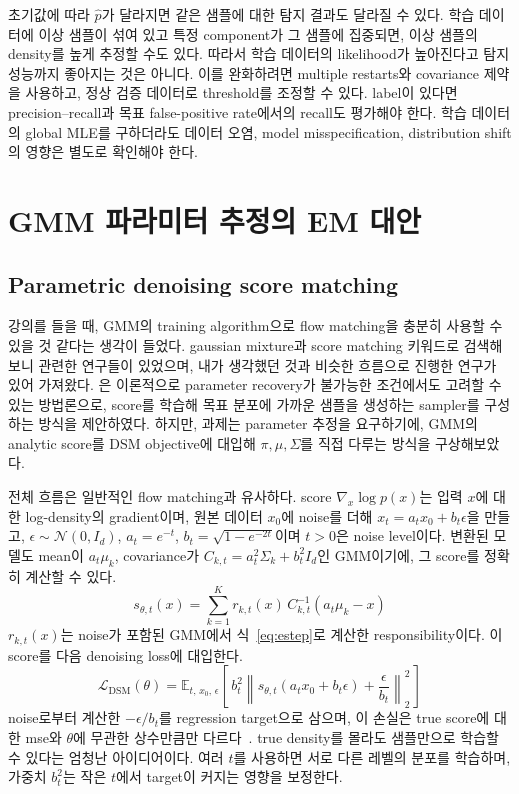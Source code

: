\documentclass[a4paper,11pt]{article}
\newcommand{\E}{\mathbb{E}}
\newcommand{\Normal}{\mathcal{N}}
\numberwithin{equation}{section}
\begin{document}
초기값에 따라 $\widehat p$가 달라지면 같은 샘플에 대한 탐지 결과도 달라질 수 있다.
학습 데이터에 이상 샘플이 섞여 있고 특정 component가 그 샘플에 집중되면,
이상 샘플의 density를 높게 추정할 수도 있다. 따라서 학습 데이터의 likelihood가 높아진다고
탐지 성능까지 좋아지는 것은 아니다.
이를 완화하려면 multiple restarts와 covariance 제약을 사용하고,
정상 검증 데이터로 threshold를 조정할 수 있다. label이 있다면 precision--recall과
목표 false-positive rate에서의 recall도 평가해야 한다.
학습 데이터의 global MLE를 구하더라도 데이터 오염, model misspecification,
distribution shift의 영향은 별도로 확인해야 한다.


\section{GMM 파라미터 추정의 EM 대안}

\subsection{Parametric denoising score matching}
\label{sec:dsm}

강의를 들을 때, GMM의 training algorithm으로 flow matching을 충분히 사용할 수 있을 것 같다는 생각이 들었다. gaussian mixture과 score matching 키워드로 검색해보니 관련한 연구들이 있었으며, 내가 생각했던 것과 비슷한 흐름으로 진행한 연구가 있어 가져왔다.
\citet{score2025}은 이론적으로 parameter recovery가 불가능한 조건에서도 고려할 수 있는 방법론으로, score를 학습해 목표 분포에 가까운 샘플을 생성하는 sampler를 구성하는 방식을 제안하였다.
하지만, 과제는 parameter 추정을 요구하기에, GMM의 analytic score를 DSM objective에 대입해 $\pi,\mu,\Sigma$를 직접 다루는 방식을 구상해보았다.

전체 흐름은 일반적인 flow matching과 유사하다. score $\nabla_x\log p(x)$는 입력 $x$에 대한 log-density의 gradient이며, 원본 데이터 $x_0$에 noise를 더해 $x_t=a_tx_0+b_t\epsilon$을 만들고, $\epsilon\sim\Normal(0,I_d)$, $a_t=e^{-t}$, $b_t=\sqrt{1-e^{-2t}}$이며 $t>0$은 noise level이다.
변환된 모델도 mean이 $a_t\mu_k$, covariance가 $C_{k,t}=a_t^2\Sigma_k+b_t^2I_d$인 GMM이기에,
그 score를 정확히 계산할 수 있다.
\begin{equation}
 s_{\theta,t}(x)=\sum_{k=1}^{K}r_{k,t}(x)\,C_{k,t}^{-1}(a_t\mu_k-x)
 \label{eq:gmm-score}
\end{equation}
$r_{k,t}(x)$는 noise가 포함된 GMM에서 식~\eqref{eq:estep}로 계산한 responsibility이다.
이 score를 다음 denoising loss에 대입한다.
\begin{equation}
 \mathcal L_{\mathrm{DSM}}(\theta)
 =\E_{t,\,x_0,\,\epsilon}\left[\,b_t^2\left\|
 s_{\theta,t}(a_tx_0+b_t\epsilon)+\frac{\epsilon}{b_t}\right\|_2^2\,\right]
 \label{eq:parametric-dsm}
\end{equation}
noise로부터 계산한 $-\epsilon/b_t$를 regression target으로 삼으며,
이 손실은 true score에 대한 mse와 $\theta$에 무관한 상수만큼만 다르다~\citep{vincent2011}.
true density를 몰라도 샘플만으로 학습할 수 있다는 엄청난 아이디어이다.
여러 $t$를 사용하면 서로 다른 레벨의 분포를 학습하며, 가중치 $b_t^2$는 작은 $t$에서 target이 커지는 영향을 보정한다.
\end{document}
